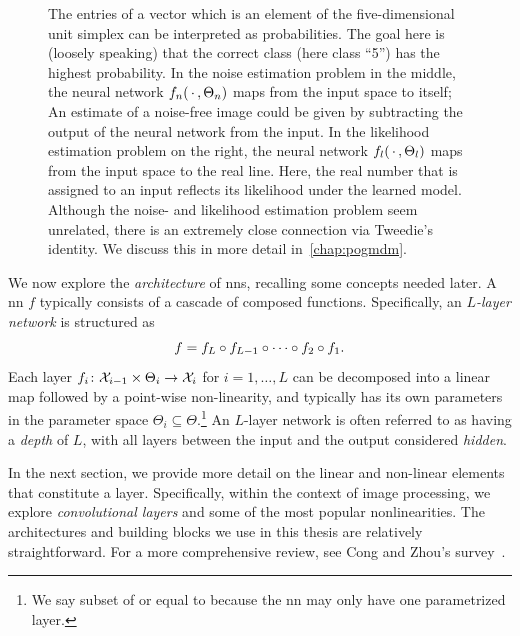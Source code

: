 \begin{figure}
{		The entries of a vector which is an element of the five-dimensional unit simplex can be interpreted as probabilities.
		The goal here is (loosely speaking) that the correct class (here class \enquote{5}) has the highest probability.
		In the noise estimation problem in the middle, the neural network \( f_n(\,\cdot\,, \Theta_n) \) maps from the input space to itself;
		An estimate of a noise-free image could be given by subtracting the output of the neural network from the input.
		In the likelihood estimation problem on the right, the neural network \( f_l(\,\cdot\,, \Theta_l) \) maps from the input space to the real line.
		Here, the real number that is assigned to an input reflects its likelihood under the learned model.
		Although the noise- and likelihood estimation problem seem unrelated, there is an extremely close connection via Tweedie's identity.
		We discuss this in more detail in~\cref{chap:pogmdm}.
	}%
	\label{fig:neural network examples}
\end{figure}

We now explore the \emph{architecture} of \glspl{nn}, recalling some concepts needed later.
A \gls{nn} \( f \) typically consists of a cascade of composed functions.
Specifically, an \emph{\( L \)-layer network} is structured as
\begin{equation}
	f = f_L \circ f_{L-\num{1}} \circ \cdots \circ f_{\num{2}} \circ f_{\num{1}}.
	\label{eq:neural network composition}
\end{equation}
Each layer \( f_i \colon \mathcal{X}_{i-\num{1}} \times \Theta_i \to \mathcal{X}_{i} \) for \( i = \num{1}, \dotsc, L \) can be decomposed into a linear map followed by a point-wise non-linearity, and typically has its own parameters in the parameter space \( \Theta_i \subseteq \Theta \).\footnote{%
	We say subset of or equal to because the \gls{nn} may only have one parametrized layer.
}
An \( L \)-layer network is often referred to as having a \emph{depth} of \( L \), with all layers between the input and the output considered \emph{hidden}.

In the next section, we provide more detail on the linear and non-linear elements that constitute a layer.
Specifically, within the context of image processing, we explore \emph{convolutional layers} and some of the most popular nonlinearities.
The architectures and building blocks we use in this thesis are relatively straightforward.
For a more comprehensive review, see Cong and Zhou's survey~\cite{Cong2022}.

